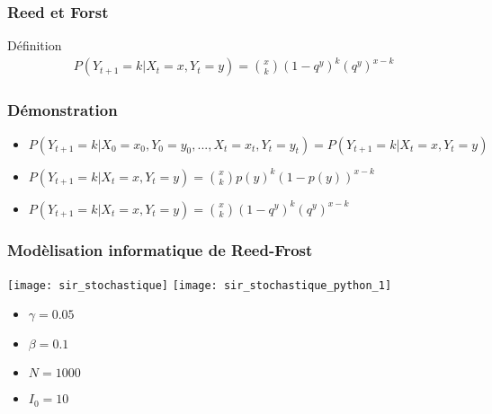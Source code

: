 \begin{frame}
    \frametitle{Reed et Forst}

    \begin{alertblock}{Définition}
        \begin{align}
            P(Y_{t+1} = k | X_t = x, Y_t = y)= \binom{x}{k}(1 - q^{y})^{k}(q^{y})^{x - k}
        \end{align}
    \end{alertblock}
\end{frame}


\begin{frame}
	\frametitle{Démonstration}
	\begin{itemize}
	\item $P(Y_{t+1} = k | X_0 = x_0, Y_0 = y_0, ..., X_t = x_t, Y_t = y_t) = P(Y_{t+1} = k | X_t = x, Y_t = y)$
	\item  $P(Y_{t+1} = k | X_t = x, Y_t = y)=\binom{x}{k}p(y)^{k} (1-p(y))^{x-k}$
	\item $P(Y_{t+1} = k | X_t = x, Y_t = y)= \binom{x}{k}(1 - q^{y})^{k}(q^{y})^{x - k}$
	\end{itemize}
\end{frame}

\begin{frame}
        \frametitle{Modèlisation informatique de Reed-Frost}

		\texttt{[image: sir\_stochastique]}
		\texttt{[image: sir\_stochastique\_python\_1]}

        \begin{multicols}{2}
            \begin{itemize}
                    \item $\gamma = 0.05$
                    \item $\beta = 0.1$
                    \item $N = 1000$
                    \item $I_0 = 10$
            \end{itemize}
        \end{multicols}

\end{frame}



